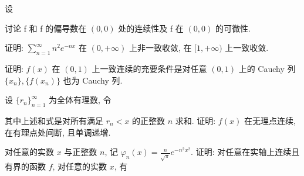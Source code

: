 设\par
\nopagebreak[4]
讨论 f 和 f 的偏导数在  $(0,0)$  处的连续性及 f 在  $(0,0)$  的可微性.\par
\par{}
证明: $\sum_{n=1}^{\infty} n^{2} e^{-nx}$ 在 $(0, +\infty)$ 上非一致收敛, 在 $[1, +\infty)$ 上一致收敛.\par
\par{}
证明: $f(x)$ 在 $(0,1)$ 上一致连续的充要条件是对任意 $(0,1)$ 上的 Cauchy 列 $\{x_{n}\}, \{f(x_{n})\}$ 也为 Cauchy 列.\par
\par{}
\par{}
设 $\{r_n\}_{n=1}^{\infty}$ 为全体有理数, 令\par
\nopagebreak[4]
其中上述和式是对所有满足 $r_n < x$ 的正整数 $n$ 求和. 证明: $f(x)$ 在无理点连续, 在有理点处间断, 且单调递增.\par
\par{}
\par{}
对任意的实数 $x$ 与正整数 $n$, 记 $\varphi_n(x) = \frac{n}{\sqrt{\pi}} e^{-n^2 x^2}$. 证明: 对任意在实轴上连续且有界的函数 $f$, 对任意的实数 $x$, 有\par
\nopagebreak[4]

